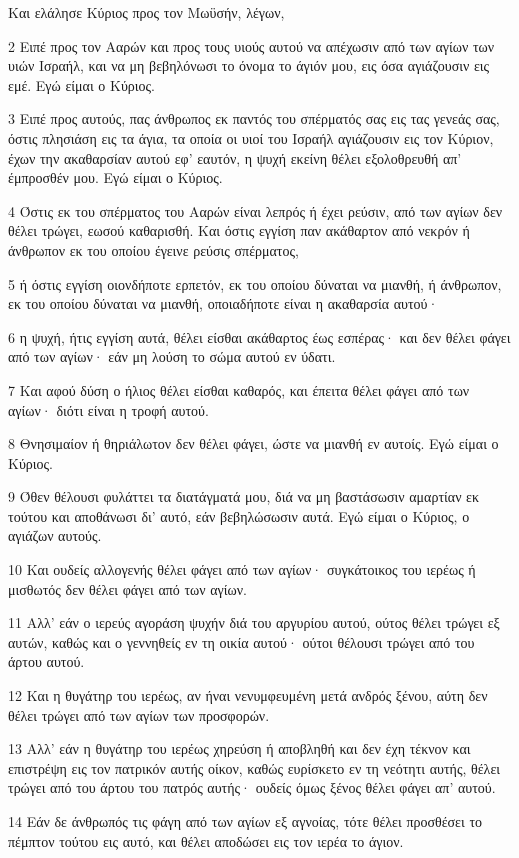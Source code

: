 \par Και ελάλησε Κύριος προς τον Μωϋσήν, λέγων,
\par 2 Ειπέ προς τον Ααρών και προς τους υιούς αυτού να απέχωσιν από των αγίων των υιών Ισραήλ, και να μη βεβηλόνωσι το όνομα το άγιόν μου, εις όσα αγιάζουσιν εις εμέ. Εγώ είμαι ο Κύριος.
\par 3 Ειπέ προς αυτούς, πας άνθρωπος εκ παντός του σπέρματός σας εις τας γενεάς σας, όστις πλησιάση εις τα άγια, τα οποία οι υιοί του Ισραήλ αγιάζουσιν εις τον Κύριον, έχων την ακαθαρσίαν αυτού εφ' εαυτόν, η ψυχή εκείνη θέλει εξολοθρευθή απ' έμπροσθέν μου. Εγώ είμαι ο Κύριος.
\par 4 Όστις εκ του σπέρματος του Ααρών είναι λεπρός ή έχει ρεύσιν, από των αγίων δεν θέλει τρώγει, εωσού καθαρισθή. Και όστις εγγίση παν ακάθαρτον από νεκρόν ή άνθρωπον εκ του οποίου έγεινε ρεύσις σπέρματος,
\par 5 ή όστις εγγίση οιονδήποτε ερπετόν, εκ του οποίου δύναται να μιανθή, ή άνθρωπον, εκ του οποίου δύναται να μιανθή, οποιαδήποτε είναι η ακαθαρσία αυτού·
\par 6 η ψυχή, ήτις εγγίση αυτά, θέλει είσθαι ακάθαρτος έως εσπέρας· και δεν θέλει φάγει από των αγίων· εάν μη λούση το σώμα αυτού εν ύδατι.
\par 7 Και αφού δύση ο ήλιος θέλει είσθαι καθαρός, και έπειτα θέλει φάγει από των αγίων· διότι είναι η τροφή αυτού.
\par 8 Θνησιμαίον ή θηριάλωτον δεν θέλει φάγει, ώστε να μιανθή εν αυτοίς. Εγώ είμαι ο Κύριος.
\par 9 Όθεν θέλουσι φυλάττει τα διατάγματά μου, διά να μη βαστάσωσιν αμαρτίαν εκ τούτου και αποθάνωσι δι' αυτό, εάν βεβηλώσωσιν αυτά. Εγώ είμαι ο Κύριος, ο αγιάζων αυτούς.
\par 10 Και ουδείς αλλογενής θέλει φάγει από των αγίων· συγκάτοικος του ιερέως ή μισθωτός δεν θέλει φάγει από των αγίων.
\par 11 Αλλ' εάν ο ιερεύς αγοράση ψυχήν διά του αργυρίου αυτού, ούτος θέλει τρώγει εξ αυτών, καθώς και ο γεννηθείς εν τη οικία αυτού· ούτοι θέλουσι τρώγει από του άρτου αυτού.
\par 12 Και η θυγάτηρ του ιερέως, αν ήναι νενυμφευμένη μετά ανδρός ξένου, αύτη δεν θέλει τρώγει από των αγίων των προσφορών.
\par 13 Αλλ' εάν η θυγάτηρ του ιερέως χηρεύση ή αποβληθή και δεν έχη τέκνον και επιστρέψη εις τον πατρικόν αυτής οίκον, καθώς ευρίσκετο εν τη νεότητι αυτής, θέλει τρώγει από του άρτου του πατρός αυτής· ουδείς όμως ξένος θέλει φάγει απ' αυτού.
\par 14 Εάν δε άνθρωπός τις φάγη από των αγίων εξ αγνοίας, τότε θέλει προσθέσει το πέμπτον τούτου εις αυτό, και θέλει αποδώσει εις τον ιερέα το άγιον.
